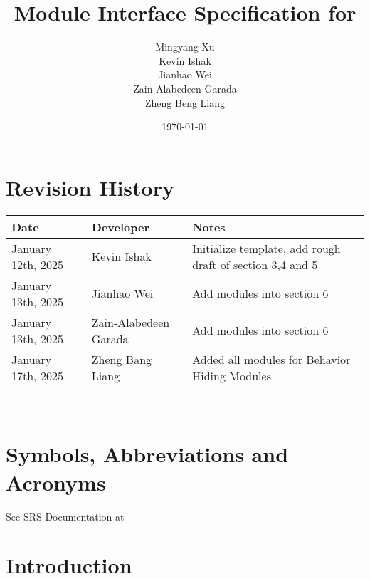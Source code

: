 \documentclass[12pt, titlepage]{article}
\begin{document}
\title{Module Interface Specification for }

\author{\authname Mingyang Xu \\ Kevin Ishak \\ Jianhao Wei \\ Zain-Alabedeen Garada \\ Zheng Beng Liang}

\date{\today}

\maketitle


\section{Revision History}

\begin{tabularx}{\textwidth}{p{4cm}p{3cm}X}
\toprule {\bf Date} & {\bf Developer} & {\bf Notes}\\
\midrule
January 12th, 2025 & Kevin Ishak & Initialize template, add rough draft of section 3,4 and 5\\
January 13th, 2025 & Jianhao Wei & Add modules into section 6\\
January 13th, 2025 & Zain-Alabedeen Garada & Add modules into section 6\\
January 17th, 2025 & Zheng Bang Liang & Added all modules for Behavior Hiding Modules\\
\bottomrule
\end{tabularx}

~\newpage

\section{Symbols, Abbreviations and Acronyms}

See SRS Documentation at 


\newpage

\tableofcontents

\newpage


\section{Introduction}
\end{document}

